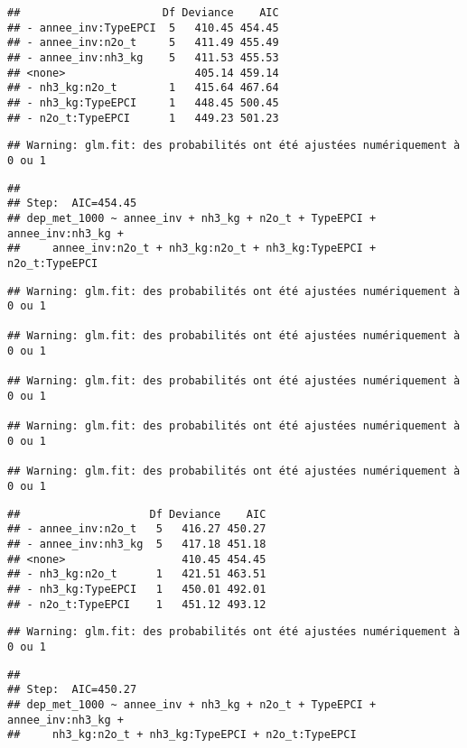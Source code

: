\documentclass[
]{article}
\begin{document}
\begin{verbatim}
##                      Df Deviance    AIC
## - annee_inv:TypeEPCI  5   410.45 454.45
## - annee_inv:n2o_t     5   411.49 455.49
## - annee_inv:nh3_kg    5   411.53 455.53
## <none>                    405.14 459.14
## - nh3_kg:n2o_t        1   415.64 467.64
## - nh3_kg:TypeEPCI     1   448.45 500.45
## - n2o_t:TypeEPCI      1   449.23 501.23
\end{verbatim}

\begin{verbatim}
## Warning: glm.fit: des probabilités ont été ajustées numériquement à 0 ou 1
\end{verbatim}

\begin{verbatim}
## 
## Step:  AIC=454.45
## dep_met_1000 ~ annee_inv + nh3_kg + n2o_t + TypeEPCI + annee_inv:nh3_kg + 
##     annee_inv:n2o_t + nh3_kg:n2o_t + nh3_kg:TypeEPCI + n2o_t:TypeEPCI
\end{verbatim}

\begin{verbatim}
## Warning: glm.fit: des probabilités ont été ajustées numériquement à 0 ou 1

## Warning: glm.fit: des probabilités ont été ajustées numériquement à 0 ou 1

## Warning: glm.fit: des probabilités ont été ajustées numériquement à 0 ou 1

## Warning: glm.fit: des probabilités ont été ajustées numériquement à 0 ou 1

## Warning: glm.fit: des probabilités ont été ajustées numériquement à 0 ou 1
\end{verbatim}

\begin{verbatim}
##                    Df Deviance    AIC
## - annee_inv:n2o_t   5   416.27 450.27
## - annee_inv:nh3_kg  5   417.18 451.18
## <none>                  410.45 454.45
## - nh3_kg:n2o_t      1   421.51 463.51
## - nh3_kg:TypeEPCI   1   450.01 492.01
## - n2o_t:TypeEPCI    1   451.12 493.12
\end{verbatim}

\begin{verbatim}
## Warning: glm.fit: des probabilités ont été ajustées numériquement à 0 ou 1
\end{verbatim}

\begin{verbatim}
## 
## Step:  AIC=450.27
## dep_met_1000 ~ annee_inv + nh3_kg + n2o_t + TypeEPCI + annee_inv:nh3_kg + 
##     nh3_kg:n2o_t + nh3_kg:TypeEPCI + n2o_t:TypeEPCI
\end{verbatim}
\end{document}
